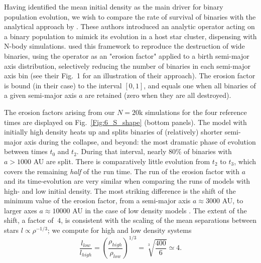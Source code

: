 Having identified the mean initial density as the main driver for binary population evolution, we wish to compare the rate of survival of binaries with the analytical approach by  \cite{Marks2011}. These authors  introduced an analytic operator acting on a binary population to mimick its evolution in  a host star cluster,  dispensing with N-body simulations.  \cite{Marks2012} used this framework to reproduce the destruction of wide binaries, using the operator as an "erosion  factor" applied to a birth semi-major axis distribution, selectively reducing the number of binaries in each semi-major axis bin (see their Fig.~1 for an illustration of their approach). The erosion factor is bound (in their case) to the interval $[0, 1]$, and equals one when all binaries of a given semi-major axis $a$ are retained (zero when they are all destroyed). 


 The erosion factors arising from our $N = 20$k simulations for the four reference times are displayed on  Fig.~\ref{Fig:6_S_shape} (bottom panels). 
%
The model with initially high density heats up and splits binaries of  (relatively) shorter semi-major axis  during the collapse, and beyond: the most dramatic phase of evolution between times  $t_0$ and $t_2$. During that interval,  nearly 80\% of  binaries with $a > 1000 $ AU are split. There is comparatively little evolution from $t_2$ to $t_3$,  which covers the remaining {\it half} of the run time.  
The run of the erosion factor with $a$  and its time-evolution are very similar  when comparing the runs of models with  high- and low initial  density. The most striking difference is the shift of the minimum value of the erosion factor, from a semi-major axis $a \approx 3 000$ AU, to larger axes $a \approx 10 000$ AU  in the case of low density models .  The extent of the shift, a factor of $~4$, is consistent with the scaling of the mean separations between stars $ l \propto \rho^{-1/3}$; we compute for high and low density systems 
\begin{equation}
\frac{l_{low}}{l_{high}} = \left(  \frac{\rho_{high}}{\rho_{low}}\right)^{1/3} = \sqrt[3]{\frac{400}{6}} \simeq 4 .
\end{equation}

